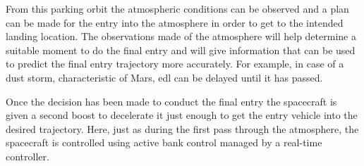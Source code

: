 From this parking orbit the atmospheric conditions can be observed and a plan can be made for the entry into the atmosphere in order to get to the intended landing location. The observations made of the atmosphere will help determine a suitable moment to do the final entry and will give information that can be used to predict the final entry trajectory more accurately. For example, in case of a dust storm, characteristic of Mars, \gls{edl} can be delayed until it has passed.

Once the decision has been made to conduct the final entry the spacecraft is given a second boost to decelerate it just enough to get the entry vehicle into the desired trajectory. Here, just as during the first pass through the atmosphere, the spacecraft is controlled using active bank control managed by a real-time controller. %